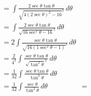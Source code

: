 \documentclass[preview]{standalone}
\begin{document}
\begin{align*}
&= \int \frac{2\sec\theta\tan\theta}{\sqrt{4(2\sec\theta)^2-16}^3} \, d\theta \\ &=\int \frac{2\sec\theta\tan\theta}{\sqrt{16\sec^2\theta-16}^3} \, d\theta \\ &=2\int \frac{\sec\theta\tan\theta}{\sqrt{16(1\sec^2\theta-1)}^3} \, d\theta \\ &=\frac{2}{4^3} \int \frac{\sec\theta\tan\theta}{\sqrt{\tan^2\theta}^3} \, d\theta \\ &=\frac{1}{32} \int \frac{\sec\theta\tan\theta}{\tan^3\theta} \, d\theta \\ &=\frac{1}{32} \int \frac{\sec\theta}{\tan^2\theta }\, d\theta&=
\end{align*}
\end{document}
